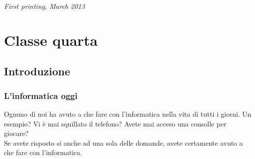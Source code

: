 \documentclass[11pt,fleqn,a5paper]{book} %
\begin{document}
    \noindent \textit{First printing, March 2013} %
    
    
    
    
    \pagestyle{empty} %
    
    \tableofcontents %
    
    \cleardoublepage %
    
    \pagestyle{fancy} %
    
    
    \part{Classe quarta}
    \label{part: Classe quarta}
    
    
    
    \chapter{Introduzione}
    \label{cap: Introduzione}
        
        \section{L'informatica oggi}
        \label{sec: L'informatica oggi}
    		Ognuno di noi ha avuto a che fare con l'informatica nella vita di tutti i giorni. Un esempio? Vi è mai squillato il telefono? Avete mai acceso una consolle per giocare?\\ Se avete risposto si anche ad una sola delle domande, avete certamente avuto a che fare con l'informatica.
    		
\end{document}
